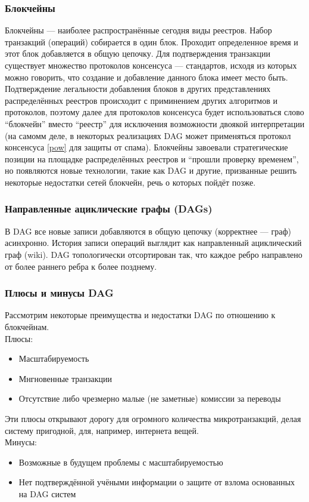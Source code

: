 \subsubsection{Блокчейны}\label{struct_block}
Блокчейны --- наиболее распространённые сегодня виды реестров. Набор транзакций
(операций) собирается в один блок. Проходит определенное время и этот блок
добавляется в общую цепочку. Для подтверждения транзакции существует множество
протоколов консенсуса --- стандартов, исходя из которых можно говорить, что
создание и добавление данного блока имеет место быть. Подтверждение легальности
добавления блоков в других представлениях распределённых реестров происходит с
приминением других алгоритмов и протоколов, поэтому далее для протоколов
консенсуса будет использоваться слово ``блокчейн'' вместо ``реестр'' для
исключения возможности двоякой интерпретации (на самомм деле, в некоторых
реализациях DAG \cite{Popov2018} может применяться протокол консенсуса
\ref{pow} для защиты от спама). Блокчейны завоевали стратегические позиции на
площадке распределённых реестров и ``прошли проверку временем'', но появляются
новые технологии, такие как DAG и другие, призванные решить некоторые
недостатки сетей блокчейн, речь о которых пойдёт позже.

\subsubsection{Направленные ациклические графы (DAGs)}\label{struct_dags}
В DAG все новые записи добавляются в общую цепочку (корректнее --- граф)
асинхронно. История записи операций выглядит как направленный ациклический граф
(wiki). DAG топологически отсортирован так, что каждое ребро направлено от
более раннего ребра к более позднему.

\subsubsection{Плюсы и минусы DAG}
Рассмотрим некоторые преимущества и недостатки DAG по отношению к блокчейнам.\\
Плюсы:
\begin{itemize}
    \item Масштабируемость
    \item Мнгновенные транзакции
    \item Отсутствие либо чрезмерно малые (не заметные) комиссии за переводы
\end{itemize}
Эти плюсы открывают дорогу для огромного количества микротранзакций, делая
систему пригодной, для, например, интернета вещей.\\
Минусы:
\begin{itemize}
    \item Возможные в будущем проблемы с масштабируемостью
    \item Нет подтверждённой учёными информации о защите от взлома основанных на DAG систем
\end{itemize}

